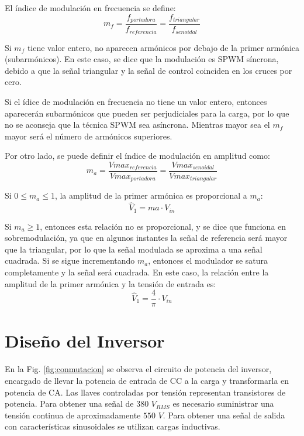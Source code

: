 \documentclass[11pt, a4paper]{article}
\begin{document}
El índice de modulación en frecuencia se define:
\[ m_f = \frac{f_{portadora}}{f_{referencia}} = \frac{f_{triangular}}{f_{senoidal}} \]

Si $m_f$ tiene valor entero, no aparecen armónicos por debajo de la primer armónica (subarmónicos). En este caso, se dice que la modulación es SPWM síncrona, debido a que la señal triangular y la señal de control coinciden en los cruces por cero. 

Si el ídice de modulación en frecuencia no tiene un valor entero, entonces aparecerán subarmónicos que pueden ser perjudiciales para la carga, por lo que no se aconseja que la técnica SPWM sea asíncrona. Mientras mayor sea el $m_f$ mayor será el número de armónicos superiores.

Por otro lado, se puede definir el índice de modulación en amplitud como:
\[ m_a = \frac{Vmax_{referencia}}{Vmax_{portadora}} = \frac{Vmax_{senoidal}}{Vmax_{triangular}} \]

Si $0 \leq m_a \leq 1$, la amplitud de la primer armónica es proporcional a $m_a$:
\[\hat{V}_1 = ma \cdot V_{in} \]

Si $m_a \geq 1$, entonces esta relación no es proporcional, y se dice que funciona en sobremodulación, ya que en algunos instantes la señal de referencia será mayor que la triangular, por lo que la señal modulada se aproxima a una señal cuadrada. Si se sigue incrementando $m_a$, entonces el modulador se satura completamente y la señal será cuadrada. En este caso, la relación entre la amplitud de la primer armónica y la tensión de entrada es:
\[ \hat{V}_1 = \frac{4}{\pi} \cdot V_{in} \]

\section{Diseño del Inversor}
En la Fig. \ref{fig:conmutacion} se observa el circuito de potencia del inversor, encargado de llevar la potencia de entrada de CC a la carga y transformarla en potencia de CA. Las llaves controladas por tensión representan transistores de potencia. Para obtener una señal de $380$ $V_{RMS}$ es necesario suministrar una tensión continua de aproximadamente $550$ $V$. Para obtener una señal de salida con características sinusoidales se utilizan cargas inductivas.
\end{document}
